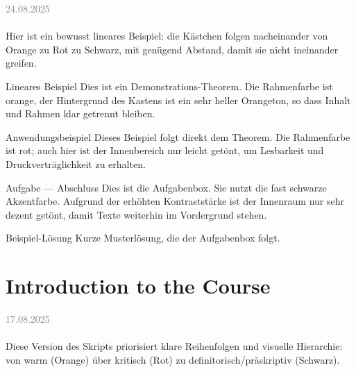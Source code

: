 \documentclass[11pt,a4paper,oneside]{article}
\newcommand{\lessondate}[1]{
	\noindent\hfill\textcolor{gray}{\textsc{#1}} \\
	\vspace{0.5cm}
}
\begin{document}
	
	\lessondate{24.08.2025}\\
	Hier ist ein bewusst lineares Beispiel: die Kästchen folgen nacheinander von Orange zu Rot zu Schwarz, mit genügend Abstand, damit sie nicht ineinander greifen.
	
	\begin{theorem}{Lineares Beispiel}
		Dies ist ein Demonstrations-Theorem. Die Rahmenfarbe ist orange, der Hintergrund des Kastens ist ein sehr heller Orangeton, so dass Inhalt und Rahmen klar getrennt bleiben.
	\end{theorem}
	
	\begin{example}{Anwendungsbeispiel}
		Dieses Beispiel folgt direkt dem Theorem. Die Rahmenfarbe ist rot; auch hier ist der Innenbereich nur leicht getönt, um Lesbarkeit und Druckverträglichkeit zu erhalten.
	\end{example}
	
	\begin{task}{Aufgabe — Abschluss}
		Dies ist die Aufgabenbox. Sie nutzt die fast schwarze Akzentfarbe. Aufgrund der erhöhten Kontraststärke ist der Innenraum nur sehr dezent getönt, damit Texte weiterhin im Vordergrund stehen.
	\end{task}
	
	\begin{solution}{Beispiel-Lösung}
		Kurze Musterlösung, die der Aufgabenbox folgt.
	\end{solution}
	
	\clearpage
	\section{Introduction to the Course}
	\lessondate{17.08.2025}\\
	Diese Version des Skripts priorisiert klare Reihenfolgen und visuelle Hierarchie: von warm (Orange) über kritisch (Rot) zu definitorisch/präskriptiv (Schwarz).
	
	
\end{document}
